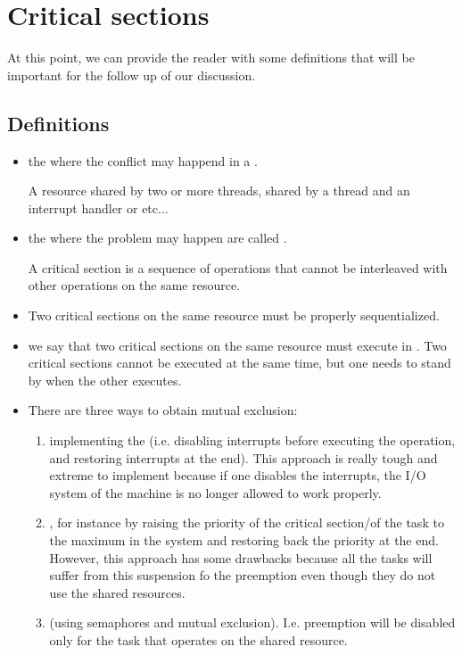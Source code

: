\section{Critical sections}
At this point, we can provide the reader with some definitions that will be important for the follow up of our discussion.
\subsection{Definitions}
\begin{itemize}
\item the  where the conflict may happend in a .

A resource shared by two or more threads, shared by a thread and an interrupt handler or etc...
\item the  where the problem may happen are called .

A critical section is a sequence of operations that cannot be interleaved with other operations on the same resource.
\item Two critical sections on the same resource must be properly sequentialized.
\item we say that two critical sections on the same resource must execute in . Two critical sections cannot be executed at the same time, but one needs to stand by when the other executes.
\item There are three ways to obtain mutual exclusion:
\begin{enumerate}
\item implementing the  (i.e. disabling interrupts before executing the operation, and restoring interrupts at the end). This approach is really tough and extreme to implement because if one disables the interrupts, the I/O system of the machine is no longer allowed to work properly.
\item {}, for instance by raising the priority of the critical section/of the task to the maximum in the system and restoring back the priority at the end. However, this approach has some drawbacks because all the tasks will suffer from this suspension fo the preemption even though they do not use the shared resources.
\item {} (using semaphores and mutual exclusion). I.e. preemption will be disabled only for the task that operates on the shared resource.
\end{enumerate}
\end{itemize}

